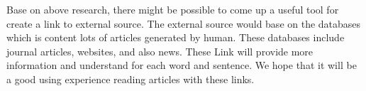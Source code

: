 \documentclass[a4paper,twocolumn]{article} %
\begin{document}
Base on above research, there might be possible to come up a useful tool for create a link to external source. The external source would base on the databases which is content lots of articles  generated by human. These databases include journal articles, websites, and also news. These Link will provide more information and understand for each word and sentence. We hope that it will be a good using experience reading articles with these links.
\end{document}

